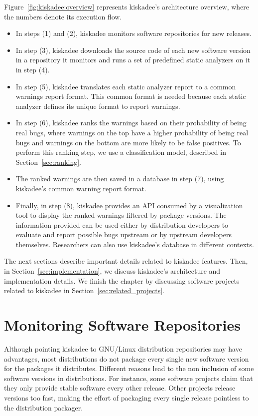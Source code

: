 Figure~\ref{fig:kiskadee:overview} represents kiskadee's architecture overview,
where the numbers denote its execution flow.
\begin{itemize}
  \item In steps (1) and (2), kiskadee
monitors software repositories for new releases.
    \item In step (3), kiskadee
downloads the source code of each new software version in a repository it
monitors and runs a set of predefined static analyzers on it in step (4).
    \item In step (5),
kiskadee translates each static analyzer report to a common warnings report format.
This common format is needed because each static analyzer defines
its unique format to report warnings.
    \item In step (6), kiskadee ranks the warnings
based on their probability of being real bugs, where warnings on the top have a
higher probability of being real bugs and warnings on the bottom are more
likely to be false positives. To perform this ranking step, we use a
classification model, described in Section~\ref{sec:ranking}.
    \item The ranked
warnings are then saved in a database in step (7), using kiskadee's common
warning report format.  
    \item Finally, in step (8), kiskadee provides an API consumed
by a visualization tool to display the ranked warnings filtered by package
versions. The information provided can be used either by distribution developers to
evaluate and report possible bugs upstream or by upstream developers
themselves. Researchers can also use kiskadee's database in different contexts.
\end{itemize}

The next sections describe important details related to
kiskadee features. Then, in Section~\ref{sec:implementation}, we discuss
kiskadee's architecture and implementation details. We finish the chapter by discussing software projects related to kiskadee in Section~\ref{sec:related_projects}.

\section{Monitoring Software Repositories}
\label{sec:monitoring}

Although pointing kiskadee to GNU/Linux distribution repositories may have
advantages, most distributions do not package every single new software version
for the packages it distributes. Different reasons lead to the non inclusion of
some software versions in distributions. For instance, some software projects
claim that they only provide stable software every other release.  Other
projects release versions too fast, making the effort of packaging every single
release pointless to the distribution packager.

